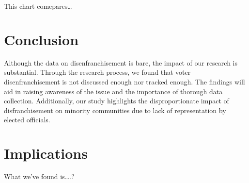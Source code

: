 \documentclass[12pt,]{tufte-handout}
\begin{document}
This chart comepares\ldots{}

\section{Conclusion}\label{conclusion}

Although the data on disenfranchisement is bare, the impact of our
research is substantial. Through the research process, we found that
voter disenfranchisement is not discussed enough nor tracked enough. The
findings will aid in raising awareness of the issue and the importance
of thorough data collection. Additionally, our study highlights the
disproportionate impact of disfranchisement on minority communities due
to lack of representation by elected officials.

\section{Implications}\label{implications}

What we've found is\ldots.?
\end{document}
